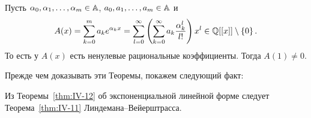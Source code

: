\begin{ntheorem}
\label{thm:IV-12}
    Пусть ${\alpha_0, \alpha_1, \dots, \alpha_m \in \AA}$, $a_0, a_1, \dots, a_m \in \AA$ и
    \[
        A(x) = \sum_{k=0}^{m} a_k e^{\alpha_{k}x} 
        = \sum_{l=0}^{\infty} \left( \sum_{k=0}^{\infty} a_k \frac{\alpha_k^l}{l!} \right)x^l \in \QQ[[x]] \setminus \left\{ 0 \right\}.
    \]
    То есть у $A(x)$ есть ненулевые рациональные коэффициенты. Тогда $A(1) \ne 0$.
\end{ntheorem}

Прежде чем доказывать эти Теоремы, покажем следующий факт:

\begin{ntheorem}
\label{thm:IV-13}
    Из Теоремы~\ref{thm:IV-12} об экспоненциальной линейной форме следует Теорема~\ref{thm:IV-11} Линдемана--Вейерштрасса.
\end{ntheorem}
